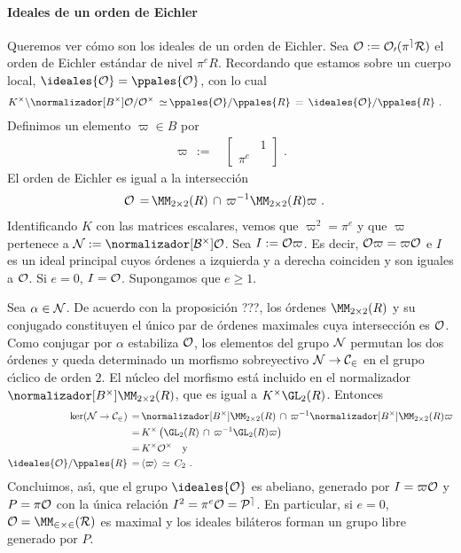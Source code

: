 
\paragraph{Ideales de un orden de Eichler}
Queremos ver c\'{o}mo son los ideales de un orden de Eichler. Sea
$\cal{O}:=\cal{O}_{0}(\pi^{e}R)$ el orden de Eichler est\'{a}ndar de nivel
$\pi^{e}R$.
Recordando que estamos sobre un cuerpo local,
$\ideales{\cal{O}}=\ppales{\cal{O}}$, con lo cual
\begin{align*}
 K^{\times}\backslash\normalizador[B^{\times}]{\cal{O}}/\cal{O}^{\times}
	\,\simeq\, & \ppales{\cal{O}}/\ppales{R}
	\,=\, \ideales{\cal{O}}/\ppales{R}
	\text{ .}
\end{align*}
%
Definimos un elemento $\varpi\in B$ por
\begin{align*}
	\varpi\,:=\, & \begin{bmatrix} & 1 \\ \pi^{e} & \end{bmatrix}
		\text{ .}
\end{align*}
%
El orden de Eichler es igual a la intersecci\'{o}n
\begin{align*}
 \cal{O} \,=\, & \MM_{2\times 2}(R)\,\cap\,
	\varpi^{-1}\MM_{2\times 2}(R)\varpi
	\text{ .}
\end{align*}
%
Identificando $K$ con las matrices escalares, vemos que $\varpi^{2}=\pi^{e}$
y que $\varpi$ pertenece a $\cal{N}:=\normalizador[B^{\times}]{\cal{O}}$.
Sea $I:=\cal{O}\varpi$. Es decir, $\cal{O}\varpi=\varpi\cal{O}$ e $I$ es un
ideal principal cuyos \'{o}rdenes a izquierda y a derecha coinciden y son
iguales a $\cal{O}$. Si $e=0$, $I=\cal{O}$. Supongamos que $e\geq 1$.

Sea $\alpha\in\cal{N}$. De acuerdo con la proposici\'{o}n
???, los \'{o}rdenes $\MM_{2\times 2}(R)$ y su conjugado constituyen el
\'{u}nico par de \'{o}rdenes maximales cuya intersecci\'{o}n es $\cal{O}$.
Como conjugar por $\alpha$ estabiliza $\cal{O}$, los elementos del grupo
$\cal{N}$ permutan los dos \'{o}rdenes y queda determinado un morfismo
sobreyectivo $\cal{N}\rightarrow C_{2}$ en el grupo c\'{\i}clico de orden
$2$. El n\'{u}cleo del morfismo est\'{a} incluido en el normalizador
$\normalizador[B^{\times}]{\MM_{2\times 2}(R)}$, que es igual a
$K^{\times}\GL_{2}(R)$. Entonces
\begin{align*}
 \ker(\cal{N}\rightarrow C_{2}) \,=\, &
	\normalizador[B^{\times}]{\MM_{2\times 2}(R)}\,\cap\,
	\varpi^{-1}\normalizador[B^{\times}]{\MM_{2\times 2}(R)}\varpi \\
 \,=\, & K^{\times}
	\left(\GL_{2}(R)\,\cap\,\varpi^{-1}\GL_{2}(R)\varpi\right) \\
 \,=\, & K^{\times}\cal{O}^{\times}
	\quad\text{y} \\
	\ideales{\cal{O}}/\ppales{R}\,=\, & \langle\varpi\rangle\,\simeq\,
	C_{2}
	\text{ .}
\end{align*}
%
Concluimos, as\'{\i}, que el grupo $\ideales{\cal{O}}$ es abeliano,
generado por $I=\varpi\cal{O}$ y $P=\pi\cal{O}$ con la \'{u}nica relaci\'{o}n
$I^{2}=\pi^{e}\cal{O}=P^{e}$. En particular, si $e=0$,
$\cal{O}=\MM_{2\times 2}(R)$ es maximal y los ideales bil\'{a}teros
forman un grupo libre generado por $P$.